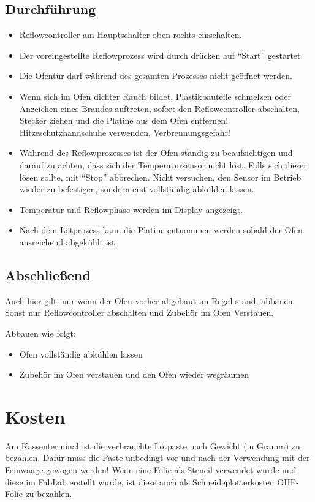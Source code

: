\documentclass{\basedir/fablab-document}
\begin{document}
\subsection{Durchführung}
\begin{itemize}
	\item Reflowcontroller am Hauptschalter oben rechts einschalten.
	\item Der voreingestellte Reflowprozess wird durch drücken auf \enquote{Start} gestartet.
	\item Die Ofentür darf während des gesamten Prozesses nicht geöffnet werden.
	\item Wenn sich im Ofen dichter Rauch bildet, Plastikbauteile schmelzen oder Anzeichen eines Brandes auftreten, sofort den Reflowcontroller abschalten, Stecker ziehen und die Platine aus dem Ofen entfernen! Hitzeschutzhandschuhe verwenden, Verbrennungsgefahr!
	\item Während des Reflowprozesses ist der Ofen ständig zu beaufsichtigen und darauf zu achten, dass sich der Temperatursensor nicht löst. Falls sich dieser lösen sollte, mit \enquote{Stop} abbrechen. Nicht versuchen, den Sensor im Betrieb wieder zu befestigen, sondern erst vollständig abkühlen lassen.
	\item Temperatur und Reflowphase werden im Display angezeigt.
	\item Nach dem Lötprozess kann die Platine entnommen werden sobald der Ofen ausreichend abgekühlt ist.
\end{itemize}
\subsection{Abschließend}
Auch hier gilt: nur wenn der Ofen vorher abgebaut im Regal stand, abbauen. Sonst nur Reflowcontroller abschalten und Zubehör im Ofen Verstauen.

Abbauen wie folgt:
\begin{itemize}
	\item Ofen vollständig abkühlen lassen
	\item Zubehör im Ofen verstauen und den Ofen wieder wegräumen
\end{itemize}



\section{Kosten}
Am Kassenterminal ist die verbrauchte Lötpaste nach Gewicht (in Gramm) zu bezahlen. Dafür muss die Paste unbedingt vor und nach der Verwendung mit der Feinwaage gewogen werden! Wenn eine Folie als Stencil verwendet wurde und diese im FabLab erstellt wurde, ist diese auch als Schneideplotterkosten OHP-Folie zu bezahlen.


\end{document}
